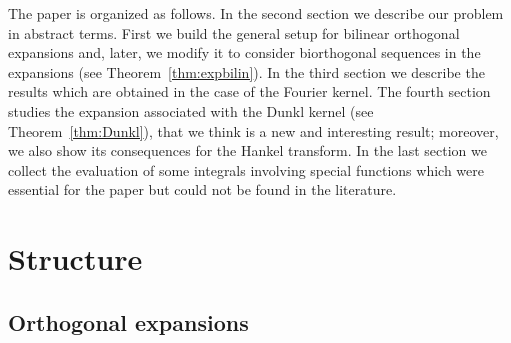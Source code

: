 \documentclass[11pt,a4paper]{amsart}
\theoremstyle{plain}
\theoremstyle{definition}
\newcommand{\R}{\mathbb{R}}
\newcommand{\calK}{\mathcal{K}}
\begin{document}
The paper is organized as follows. In the second section we
describe our problem in abstract terms. First we build the general
setup for bilinear orthogonal expansions and, later, we modify it
to consider biorthogonal sequences in the
expansions (see Theorem~\ref{thm:expbilin}). 
In the third section we describe the results which are
obtained in the case of the Fourier kernel. 
The fourth section studies the expansion associated with the Dunkl kernel
(see Theorem~\ref{thm:Dunkl}), that we think is a new and interesting result; 
moreover, we also show its consequences for the Hankel transform.
In the last section we collect the evaluation of some integrals involving 
special functions which were essential for the paper but could not be found 
in the literature.

\section{Structure}

\subsection{Orthogonal expansions}
\label{sub:set-up}

\end{document}
